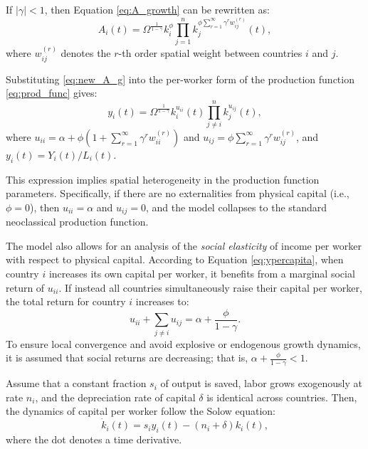 \documentclass[english,12pt]{book}\usepackage[]{graphicx}\usepackage[]{xcolor}
\begin{document}
If $|\gamma|<1$, then Equation \eqref{eq:A_growth} can be rewritten as:
\begin{equation}\label{eq:new_A_g}
A_i(t) = \Omega^{\frac{1}{1-\gamma}}k_i^{\phi}\prod_{j = 1}^nk_j^{\phi\sum_{r = 1}^{\infty}\gamma^rw_{ij}^{(r)}}(t),
\end{equation}
%
where $w_{ij}^{(r)}$ denotes the $r$-th order spatial weight between countries $i$ and $j$.

Substituting \eqref{eq:new_A_g} into the per-worker form of the production function \eqref{eq:prod_func} gives:
\begin{equation}\label{eq:ypercapita}
y_i(t) = \Omega^{\frac{1}{1-\gamma}}k_i^{u_{ii}}(t)\prod_{j\neq i}^nk_j^{u_{ij}}(t),
\end{equation}
%
where $u_{ii} = \alpha + \phi\left(1 + \sum_{r = 1}^{\infty}\gamma^rw_{ii}^{(r)}\right)$ and $u_{ij} = \phi\sum_{r = 1}^{\infty}\gamma^rw_{ij}^{(r)}$, and $y_i(t)=Y_i(t)/L_i(t)$. 

This expression implies spatial heterogeneity in the production function parameters. Specifically, if there are no externalities from physical capital (i.e., $\phi = 0$), then $u_{ii} = \alpha$ and $u_{ij} = 0$, and the model collapses to the standard neoclassical production function.

The model also allows for an analysis of the \textit{social elasticity} of income per worker with respect to physical capital. According to Equation \eqref{eq:ypercapita}, when country $i$ increases its own capital per worker, it benefits from a marginal social return of $u_{ii}$. If instead all countries simultaneously raise their capital per worker, the total return for country $i$ increases to:
\[
u_{ii} + \sum_{j \neq i} u_{ij} = \alpha + \frac{\phi}{1 - \gamma}.
\]
To ensure local convergence and avoid explosive or endogenous growth dynamics, it is assumed that social returns are decreasing; that is, $\alpha + \frac{\phi}{1 - \gamma} < 1$.

Assume that a constant fraction $s_i$ of output is saved, labor grows exogenously at rate $n_i$, and the depreciation rate of capital $\delta$ is identical across countries. Then, the dynamics of capital per worker follow the Solow equation: \begin{equation*} \dot{k}_i(t) = s_iy_i(t) - (n_i + \delta)k_i(t), \end{equation*} where the dot denotes a time derivative.
\end{document}
